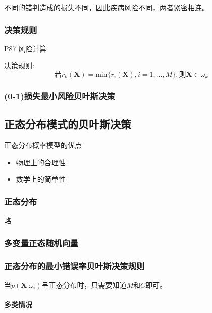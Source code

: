 \documentclass[11pt]{book}
\begin{document}
不同的错判造成的损失不同，因此疾病风险不同，两者紧密相连。

\subsubsection{决策规则}%
\label{ssub:jue_ce_gui_ze_}

P87 风险计算

决策规则:
\begin{equation}
	\mbox{若}r_k(\boldsymbol{X}) = \text{min}\{r_i(\boldsymbol{X}), i = 1, \ldots, M\}, \mbox{则}\boldsymbol{X} \in \omega_k
\end{equation}

\subsubsection{(0-1)损失最小风险贝叶斯决策}%
\label{ssub:_0_1_sun_shi_zui_xiao_feng_xian_bei_xie_si_jue_ce_}

\subsection{正态分布模式的贝叶斯决策}

正态分布概率模型的优点
\begin{itemize}
	\item 物理上的合理性
	\item 数学上的简单性
\end{itemize}

\subsubsection{正态分布}%
\label{ssub:zheng_tai_fen_bu_}

略

\subsubsection{多变量正态随机向量}%
\label{ssub:duo_bian_liang_zheng_tai_sui_ji_xiang_liang_}

\subsubsection{正态分布的最小错误率贝叶斯决策规则}%
\label{ssub:zheng_tai_fen_bu_de_zui_xiao_cuo_wu_lu_bei_xie_si_jue_ce_gui_ze_}

当$p(\boldsymbol{X}|\omega_i)$呈正态分布时，只需要知道$M$和$C$即可。

\paragraph{多类情况}%
\label{par:duo_lei_qing_kuang_}
\end{document}
